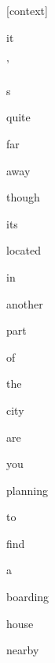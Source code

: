 \documentclass[varwidth]{standalone}
\begin{document}
\begin{CJK*}{UTF8}{gbsn}
{\setlength{\fboxsep}{0pt}\colorbox{white!0}{\parbox{0.9\textwidth}{
\colorbox{red!5.041082174870486e-16}{\strut [context]} \colorbox{red!6.238261018864932e-10}{\strut it} \colorbox{red!6.004233776835122e-10}{\strut ’} \colorbox{red!0.0016018579481169581}{\strut s} \colorbox{red!0.016945255920290947}{\strut quite} \colorbox{red!0.1982375681400299}{\strut far} \colorbox{red!3.0771427154541016}{\strut away} \colorbox{red!6.060816764831543}{\strut though} \colorbox{red!3.3296477794647217}{\strut its} \colorbox{red!0.07126221805810928}{\strut located} \colorbox{red!6.4047346115112305}{\strut in} \colorbox{red!0.7261956334114075}{\strut another} \colorbox{red!1.2488371133804321}{\strut part} \colorbox{red!0.29241788387298584}{\strut of} \colorbox{red!7.440187931060791}{\strut the} \colorbox{red!51.92584228515625}{\strut city} \colorbox{red!0.9219577312469482}{\strut are} \colorbox{red!4.218400001525879}{\strut you} \colorbox{red!6.3406782150268555}{\strut planning} \colorbox{red!0.9124165177345276}{\strut to} \colorbox{red!0.6195507049560547}{\strut find} \colorbox{red!0.07895022630691528}{\strut a} \colorbox{red!0.8531514406204224}{\strut boarding} \colorbox{red!0.5242866277694702}{\strut house} \colorbox{red!4.736736297607422}{\strut nearby} 
}}}
\end{CJK*}
\end{document}
